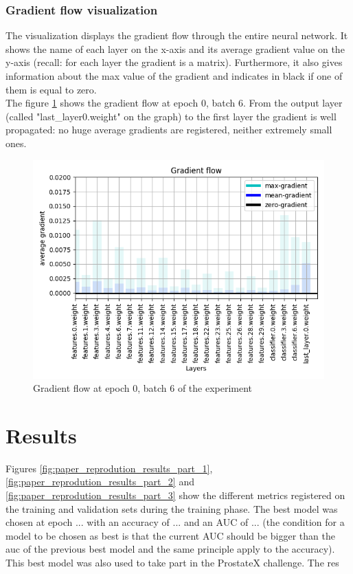 \subsubsection{Gradient flow visualization}
The visualization displays the gradient flow through the entire neural network. It shows the name of each layer on the x-axis and its average gradient value on the y-axis (recall: for each layer the gradient is a matrix). Furthermore, it also gives information about the max value of the gradient and indicates in black if one of them is equal to zero.\\
The figure \ref{fig:gradient_flow} shows the gradient flow at epoch 0, batch 6. From the output layer (called "last\_layer0.weight" on the graph) to the first layer the gradient is well propagated: no huge average gradients are registered, neither extremely small ones.

\begin{figure}[!h]
\centering
\includegraphics[width=1\textwidth, keepaspectratio=true]{./figures/gradient_flow.png}
\caption{Gradient flow at epoch 0, batch 6 of the experiment}
\label{fig:gradient_flow}
\end{figure}
\section{Results}
Figures \ref{fig:paper_reprodution_results_part_1}, \ref{fig:paper_reprodution_results_part_2} and \ref{fig:paper_reprodution_results_part_3} show the different metrics registered on the training and validation sets during the training phase. The best model was chosen at epoch ... with an accuracy of ... and an AUC of ... (the condition for a model to be chosen as best is that the current AUC should be bigger than the auc of the previous best model and the same principle apply to the accuracy).\\
This best model was also used to take part in the ProstateX challenge. The res

